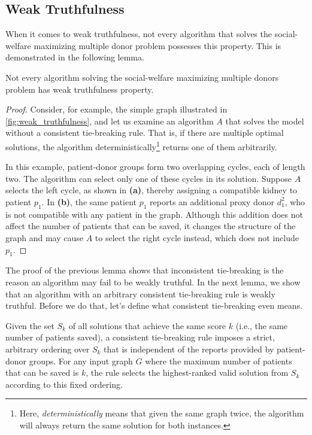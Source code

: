 \subsection{Weak Truthfulness}
When it comes to weak truthfulness, not every algorithm that solves the social-welfare maximizing multiple donor problem possesses this property. This is demonstrated in the following lemma.

\begin{lemma}
\label{lemma:weak_truthfulness_false}
    Not every algorithm solving the social-welfare maximizing multiple donors problem has weak truthfulness property.
    \begin{proof}
        Consider, for example, the simple graph illustrated in \autoref{fig:weak_truthfulness}, and let us examine an algorithm $A$ that solves the model without a consistent tie-breaking rule. That is, if there are multiple optimal solutions, the algorithm deterministically\footnote{Here, \textit{deterministically} means that given the same graph twice, the algorithm will always return the same solution for both instances.} returns one of them arbitrarily.
    
        In this example, patient-donor groups form two overlapping cycles, each of length two. The algorithm can select only one of these cycles in its solution. Suppose $A$ selects the left cycle, as shown in \textbf{(a)}, thereby assigning a compatible kidney to patient $p_1$. In \textbf{(b)}, the same patient $p_1$ reports an additional proxy donor $d_1^2$, who is not compatible with any patient in the graph. Although this addition does not affect the number of patients that can be saved, it changes the structure of the graph and may cause $A$ to select the right cycle instead, which does not include $p_1$.
    \end{proof}
\end{lemma}

The proof of the previous lemma shows that inconsistent tie-breaking is the reason an algorithm may fail to be weakly truthful. In the next lemma, we show that an algorithm with an arbitrary consistent tie-breaking rule is weakly truthful. Before we do that, let's define what consistent tie-breaking even means.

\begin{definition}
\label{consistent_tie_breaking_rule}
    Given the set $S_k$ of all solutions that achieve the same score $k$ (i.e., the same number of patients saved), a consistent tie-breaking rule imposes a strict, arbitrary ordering over $S_k$ that is independent of the reports provided by patient-donor groups. For any input graph $G$ where the maximum number of patients that can be saved is $k$, the rule selects the highest-ranked valid solution from $S_k$ according to this fixed ordering.
\end{definition}

